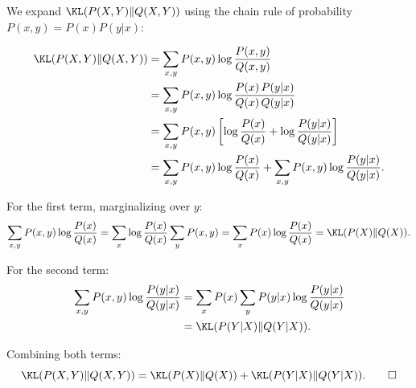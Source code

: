 \begin{answer}
We expand $\KL(P(X,Y)\|Q(X,Y))$ using the chain rule of probability $P(x,y) = P(x)P(y|x)$:

\begin{align*}
\KL(P(X,Y)\|Q(X,Y))
&= \sum_{x,y} P(x,y) \log \frac{P(x,y)}{Q(x,y)} \\
&= \sum_{x,y} P(x,y) \log \frac{P(x)\,P(y|x)}{Q(x)\,Q(y|x)} \\
&= \sum_{x,y} P(x,y) \left[\log \frac{P(x)}{Q(x)} + \log \frac{P(y|x)}{Q(y|x)}\right] \\
&= \sum_{x,y} P(x,y) \log \frac{P(x)}{Q(x)} + \sum_{x,y} P(x,y) \log \frac{P(y|x)}{Q(y|x)}.
\end{align*}

For the first term, marginalizing over $y$:
$$\sum_{x,y} P(x,y)\log\frac{P(x)}{Q(x)} = \sum_x \log\frac{P(x)}{Q(x)}\sum_y P(x,y) = \sum_x P(x)\log\frac{P(x)}{Q(x)} = \KL(P(X)\|Q(X)).$$

For the second term:
\begin{align*}
\sum_{x,y} P(x,y)\log\frac{P(y|x)}{Q(y|x)}
&= \sum_x P(x) \sum_y P(y|x)\log\frac{P(y|x)}{Q(y|x)} \\
&= \KL(P(Y|X)\|Q(Y|X)).
\end{align*}

Combining both terms:
$$\KL(P(X,Y)\|Q(X,Y)) = \KL(P(X)\|Q(X)) + \KL(P(Y|X)\|Q(Y|X)). \qquad \square$$
\end{answer}
